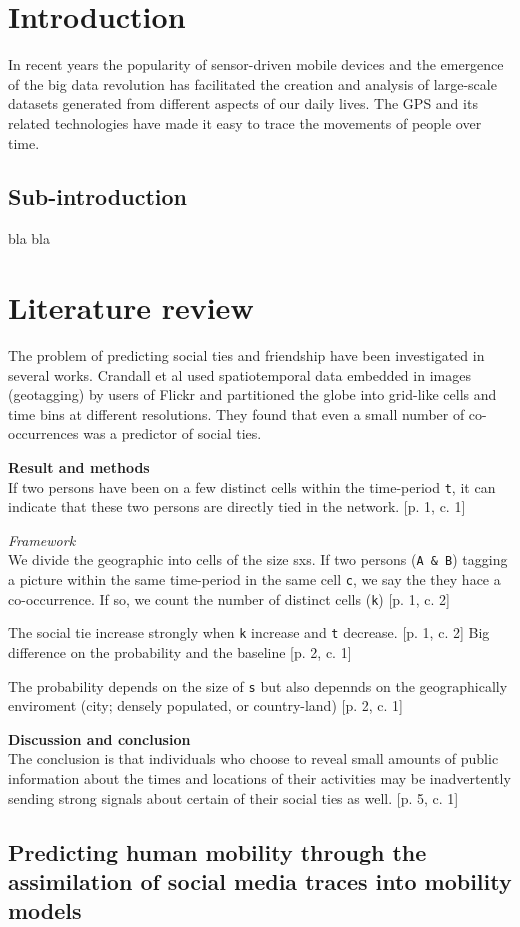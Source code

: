 \section{Introduction}
In recent years the popularity of sensor-driven mobile devices and the emergence of the big data revolution has facilitated the creation and analysis of large-scale datasets generated from different aspects of our daily lives\cite{lazer2009life}. The GPS and its related technologies have made it easy to trace the movements of people over time.

\subsection{Sub-introduction}
bla bla


\section{Literature review}
The problem of predicting social ties and friendship have been investigated in several works. Crandall et al\cite{ISTfGC} used spatiotemporal data embedded in images (geotagging) by users of Flickr and partitioned the globe into grid-like cells and time bins at different resolutions. They found that even a small number of co-occurrences was a predictor of social ties. 



\textbf{Result and methods}\\
If two persons have been on a few distinct cells within the time-period \texttt{t}, it can indicate that these two persons are directly tied in the network. [p. 1, c. 1]

\textit{Framework}\\
We divide the geographic into cells of the size sxs. 
If two persons (\texttt{A \& B}) tagging a picture within the same time-period in the same cell \texttt{c}, we say the they hace a co-occurrence. If so, we count the number of distinct cells (\texttt{k}) [p. 1, c. 2]


The social tie increase strongly when \texttt{k} increase and \texttt{t} decrease. [p. 1, c. 2]
Big difference on the probability and the baseline [p. 2, c. 1]

The probability depends on the size of \texttt{s} but also depennds on the geographically enviroment (city; densely populated, or country-land) [p. 2, c. 1]


\textbf{Discussion and conclusion}\\
The conclusion is that individuals who choose to reveal small amounts of public information about the times and locations of their activities may be inadvertently sending strong signals about certain of their social ties as well. [p. 5, c. 1]



\subsection{Predicting human mobility through the assimilation of social media traces into mobility models \cite{human_mob_through_assi}}